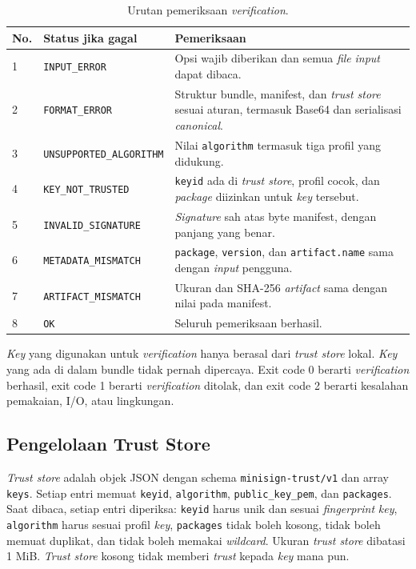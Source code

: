 \begin{table}[H]
\centering
\begin{tabular}{@{}p{0.6cm}p{5.9cm}p{7.7cm}@{}}
\toprule
No. & Status jika gagal & Pemeriksaan \\
\midrule
1 & \texttt{INPUT\_ERROR} & Opsi wajib diberikan dan semua \textit{file} \textit{input} dapat dibaca. \\
2 & \texttt{FORMAT\_ERROR} & Struktur bundle, manifest, dan \textit{trust store} sesuai aturan, termasuk Base64 dan serialisasi \textit{canonical}. \\
3 & \texttt{UNSUPPORTED\_ALGORITHM} & Nilai \texttt{algorithm} termasuk tiga profil yang didukung. \\
4 & \texttt{KEY\_NOT\_TRUSTED} & \texttt{keyid} ada di \textit{trust store}, profil cocok, dan \textit{package} diizinkan untuk \textit{key} tersebut. \\
5 & \texttt{INVALID\_SIGNATURE} & \textit{Signature} sah atas byte manifest, dengan panjang yang benar. \\
6 & \texttt{METADATA\_MISMATCH} & \texttt{package}, \texttt{version}, dan \texttt{artifact.name} sama dengan \textit{input} pengguna. \\
7 & \texttt{ARTIFACT\_MISMATCH} & Ukuran dan SHA-256 \textit{artifact} sama dengan nilai pada manifest. \\
8 & \texttt{OK} & Seluruh pemeriksaan berhasil. \\
\bottomrule
\end{tabular}
\caption{Urutan pemeriksaan \textit{verification}.}
\end{table}

\textit{Key} yang digunakan untuk \textit{verification} hanya berasal dari \textit{trust store} lokal. \textit{Key} yang
ada di dalam bundle tidak pernah dipercaya. Exit code 0 berarti \textit{verification} berhasil, exit code 1
berarti \textit{verification} ditolak, dan exit code 2 berarti kesalahan pemakaian, I/O, atau lingkungan.

\subsection{Pengelolaan Trust Store}
\textit{Trust store} adalah objek JSON dengan schema \texttt{minisign-trust/v1} dan array
\texttt{keys}. Setiap entri memuat \texttt{keyid}, \texttt{algorithm}, \texttt{public\_key\_pem},
dan \texttt{packages}. Saat dibaca, setiap entri diperiksa: \texttt{keyid} harus unik dan sesuai
\textit{fingerprint} \textit{key}, \texttt{algorithm} harus sesuai profil \textit{key}, \texttt{packages} tidak
boleh kosong, tidak boleh memuat duplikat, dan tidak boleh memakai \textit{wildcard}. Ukuran
\textit{trust store} dibatasi 1 MiB. \textit{Trust store} kosong tidak memberi \textit{trust} kepada
\textit{key} mana pun.

